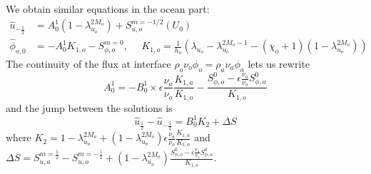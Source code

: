 We obtain similar equations in the ocean part:
\begin{equation}
	\begin{aligned}
		\widehat{u}_{-\frac{1}{2}} &= A^1_0 (1 -
			\lambda_{u_o}^{2M_o})
			+ S_{u, o}^{m=-1/2}(U_0) \\
		\widehat{\phi}_{o,0} &= - A^1_0 K_{1,o}
		-S_{\phi,o}^{m=0},
		~~~~~~ K_{1,o} = \frac{1}{h_o}
		\left(
			\lambda_{u_o}-\lambda_{u_o}^{2M_o-1}
			- (\chi_o+1)(1-\lambda_{u_o}^{2M_o})
		\right)
	\end{aligned}
\end{equation}
The continuity of the flux at interface
$\rho_o \nu_o \phi_o = \rho_a \nu_a \phi_a$ lets us rewrite
\begin{equation}
A^1_0 = - B^1_0 \times \epsilon
	\frac{\nu_a}{\nu_o} \frac{K_{1,a}}{K_{1,o}} -
	\frac{S_{\phi,o}^0 - \epsilon \frac{\nu_a}{\nu_o}
	S^0_{\phi, a}}{K_{1,o}}
\end{equation}
and the jump between the solutions is
\begin{equation}
	\widehat{u}_{\frac{1}{2}} - \widehat{u}_{-\frac{1}{2}}
	= B^1_0 K_{2} + \Delta S
\end{equation}
where $K_{2} = 1 - \lambda_{u_a}^{2M_a} + (1 - \lambda_{u_o}^{2M_o})
\epsilon \frac{\nu_a}{\nu_o} \frac{K_{1,a}}{K_{1,o}}$
and $\Delta S = S_{u, a}^{m=\frac{1}{2}} - S_{u, o}^{m=-\frac{1}{2}}
+(1 - \lambda_{u_o}^{2M_o})\frac{S_{\phi,o}^0 - \epsilon \frac{\nu_a}{\nu_o}
	S^0_{\phi, a}}{K_{1,o}}$.
